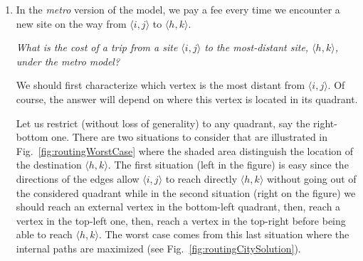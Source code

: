 \begin{itemize}
%
%
%
%

  \begin{enumerate}
  \item
In the {\em metro} version of the model, we pay a fee every time we encounter a new site on the way from $\langle i,j \rangle$ to $\langle h,k \rangle$.

\smallskip

{\em What is the cost of a trip from a site $\langle i,j \rangle$ to the most-distant site, $\langle h,k \rangle$, under the metro model?}
\smallskip

We should first characterize which vertex is the most distant from $\langle i,j \rangle$. 
Of course, the answer will depend on where this vertex is located in its quadrant.

Let us restrict (without loss of generality) to any quadrant, say the right-bottom one. 
There are two situations to consider that are illustrated in Fig.~\ref{fig:routingWorstCase}
where the shaded area distinguish the location of the destination $\langle h,k \rangle$.
The first situation (left in the figure) is easy since the directions of the edges allow $\langle i,j \rangle$ to reach directly $\langle h,k \rangle$
without going out of the considered quadrant while in the second situation (right on the figure) we should reach an external
vertex in the bottom-left quadrant, then, reach a vertex in the top-left one, then, reach a vertex in the top-right before being able to
reach $\langle h,k \rangle$.
The worst case comes from this last situation where the internal paths are maximized (see Fig.~\ref{fig:routingCitySolution}).


\end{enumerate}
\end{itemize}

